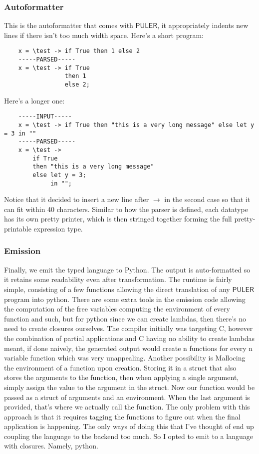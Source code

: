 \documentclass{article} %
\newcommand{\PULER}{\mathsf{PULER}}
\begin{document}
    \subsubsection{Autoformatter}
    This is the autoformatter that comes with $\PULER$, it appropriately indents new lines if there isn't too much width space. Here's a short program:
    \begin{verbatim}
    x = \test -> if True then 1 else 2
    -----PARSED-----
    x = \test -> if True
                 then 1
                 else 2;
    \end{verbatim}
    Here's a longer one:
    \begin{verbatim}
    -----INPUT-----
    x = \test -> if True then "this is a very long message" else let y = 3 in ""
    -----PARSED-----
    x = \test ->
        if True
        then "this is a very long message"
        else let y = 3;
             in "";
    \end{verbatim}
    Notice that it decided to insert a new line after $\to$ in the second case so that it can fit within 40 characters.
    Similar to how the parser is defined, each datatype has its own pretty printer, which is then stringed together forming the full pretty-printable expression type.
\subsubsection{Emission}\label{emission}
    Finally, we emit the typed language to Python. The output is auto-formatted so it retains some readability even after transformation. The runtime is fairly simple, consisting of a few functions allowing the direct translation of any $\PULER$ program into python. There are some extra tools in the emission code allowing the computation of the free variables computing the environment of every function and such, but for python since we can create lambdas, then there's no need to create closures ourselves. The compiler initially was targeting C, however the combination of partial applications and C having no ability to create lambdas meant, if done naively, the generated output would create n functions for every n variable function which was very unappealing. Another possibility is Mallocing the environment of a function upon creation. Storing it in a struct that also stores the arguments to the function, then when applying a single argument, simply assign the value to the argument in the struct. Now our function would be passed as a struct of arguments and an environment. When the last argument is provided, that's where we actually call the function. The only problem with this approach is that it requires tagging the functions to figure out when the final application is happening. The only ways of doing this that I've thought of end up coupling the language to the backend too much. So I opted to emit to a language with closures. Namely, python.
\end{document}

